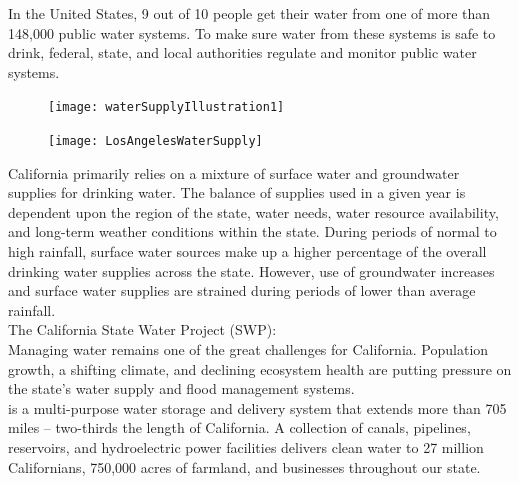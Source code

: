 \begin{itemize}
In the United States, 9 out of 10 people get their water from one of more than 148,000 public water systems. To make sure water from these systems is safe to drink, federal, state, and local authorities regulate and monitor public water systems.\\

\begin{figure}
\begin{center}
\texttt{[image: waterSupplyIllustration1]}\\
\end{center}
\end{figure}

\begin{figure}
\begin{center}
\texttt{[image: LosAngelesWaterSupply]}\\
\end{center}
\end{figure}

California primarily relies on a mixture of surface water and groundwater supplies for drinking water. The balance of supplies used in a given year is dependent upon the region of the state, water needs, water resource availability, and long-term weather conditions within the state. During periods of normal to high rainfall, surface water sources make up a higher percentage of the overall drinking water supplies across the state. However, use of groundwater increases and surface water supplies are strained during periods of lower than average rainfall.\\


The California State Water Project (SWP):\\

Managing water remains one of the great challenges for California. Population growth, a shifting climate, and declining ecosystem health are putting pressure on the state’s water supply and flood management systems.\\

 is a multi-purpose water storage and delivery system that extends more than 705 miles -- two-thirds the length of California. A collection of canals, pipelines, reservoirs, and hydroelectric power facilities delivers clean water to 27 million Californians, 750,000 acres of farmland, and businesses throughout our state.\\


\end{itemize}
